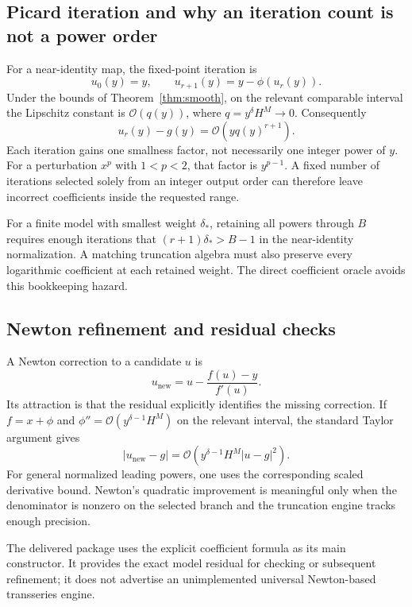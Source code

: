\documentclass[11pt,a4paper]{article}
\numberwithin{equation}{section}
\theoremstyle{definition}\newtheorem{definition}[theorem]{Definition}
\theoremstyle{remark}\newtheorem{remark}[theorem]{Remark}
\newcommand{\OO}{\mathcal O}\newcommand{\Id}{\mathrm{id}}
\begin{document}
\subsection{Picard iteration and why an iteration count is not a power order}
For a near-identity map, the fixed-point iteration is
\begin{equation}\label{eq:picard}
u_0(y)=y,\qquad u_{r+1}(y)=y-\phi(u_r(y)).
\end{equation}
Under the bounds of Theorem~\ref{thm:smooth}, on the relevant comparable interval the Lipschitz constant is $\OO(q(y))$, where $q=y^\delta H^M\to0$. Consequently
\begin{equation}
u_r(y)-g(y)=\OO(yq(y)^{r+1}).
\end{equation}
Each iteration gains one smallness factor, not necessarily one integer power of $y$. For a perturbation $x^p$ with $1<p<2$, that factor is $y^{p-1}$. A fixed number of iterations selected solely from an integer output order can therefore leave incorrect coefficients inside the requested range.

For a finite model with smallest weight $\delta_*$, retaining all powers through $B$ requires enough iterations that $(r+1)\delta_*>B-1$ in the near-identity normalization. A matching truncation algebra must also preserve every logarithmic coefficient at each retained weight. The direct coefficient oracle avoids this bookkeeping hazard.

\subsection{Newton refinement and residual checks}
A Newton correction to a candidate $u$ is
\begin{equation}\label{eq:newton}
u_{\mathrm{new}}=u-\frac{f(u)-y}{f'(u)}.
\end{equation}
Its attraction is that the residual explicitly identifies the missing correction. If $f=x+\phi$ and $\phi''=\OO(y^{\delta-1}H^M)$ on the relevant interval, the standard Taylor argument gives
\[
|u_{\mathrm{new}}-g|=\OO\!\left(y^{\delta-1}H^M|u-g|^2\right).
\]
For general normalized leading powers, one uses the corresponding scaled derivative bound. Newton's quadratic improvement is meaningful only when the denominator is nonzero on the selected branch and the truncation engine tracks enough precision.

The delivered package uses the explicit coefficient formula as its main constructor. It provides the exact model residual for checking or subsequent refinement; it does not advertise an unimplemented universal Newton-based transseries engine.
\end{document}
